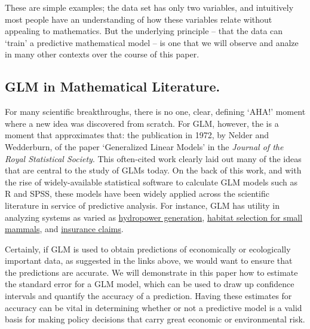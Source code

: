 \documentclass[12pt]{article}
\begin{document}
These are simple examples; the data set has only two variables, and intuitively most people have an understanding of how these variables relate 
without appealing to mathematics.  But the underlying principle -- that the data can `train' a predictive mathematical model -- is one that we will
observe and analze in many other contexts over the course of this paper.


	\subsection{GLM in Mathematical Literature.}
		For many scientific breakthroughs, there is no one, clear, defining `AHA!' moment where a new idea was discovered from scratch. For
GLM, however, the is a moment that approximates that: the publication in 1972, by Nelder and Wedderburn, of the paper `Generalized Linear Models'
in the \textit{Journal of the Royal Statistical Society}.  This often-cited work clearly laid out many of the ideas that are central to the study 
of GLMs today.  On the back of this work, and with the rise of widely-available statistical software to calculate GLM models such as R and SPSS, 
these models have been widely applied across the scientific literature in service of predictive analysis.  For instance, GLM has utility in
analyzing systems as varied as 
\href{https://www.sciencedirect.com/science/article/pii/S037877961630222X}{hydropower generation}, 
\href{https://www.sciencedirect.com/science/article/pii/S1470160X17306271}{habitat selection for small mammals}, and 
\href{https://www.sciencedirect.com/science/article/pii/S0167668715303358}{insurance claims}.  

Certainly, if GLM is used to obtain predictions of economically or ecologically important data, as suggested in the links above, we would want to 
ensure that the predictions are accurate. We will demonstrate in this paper how to estimate the standard error for a GLM model, which can be 
used to draw up confidence intervals and quantify the accuracy of a prediction.  Having these estimates for accuracy can be vital in determining
whether or not a predictive model is a valid basis for making policy decisions that carry great economic or environmental risk.

\end{document}
